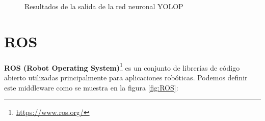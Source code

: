 \begin{figure}[H]
  \begin{center}
  \caption{Resultados de la salida de la red neuronal YOLOP\cite{YOLOP}}
  \label{f:resultadosYOLOP}
  \end{center}
 \end{figure}
 \newpage
\section{ROS}
\label{sec:ros}
\textbf{ROS (Robot Operating System)}\footnote{\url{https://www.ros.org/}} es un conjunto de librerías de código abierto utilizadas principalmente para aplicaciones robóticas. 
Podemos definir este middleware como se muestra en la figura \ref{fig:ROS}:

